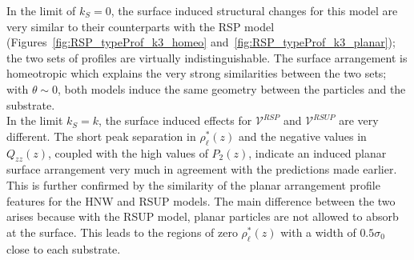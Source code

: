 In the limit of $k_S=0$, the surface induced structural changes for this model are very
similar to their counterparts with the RSP model (Figures~\ref{fig:RSP_typeProf_k3_homeo} 
and~\ref{fig:RSP_typeProf_k3_planar}); the two sets of profiles
are virtually indistinguishable. The surface arrangement is homeotropic which explains the
very strong similarities between the two sets; with $\theta\sim0$, 
both models induce the same geometry between the particles and the substrate.\\
%
In the limit $k_S=k$, the surface induced effects for $\mathcal{V}^{RSP}$ and $\mathcal{V}^{RSUP}$
are very different.
The short peak separation in $\rho^{*}_\ell(z)$ and the negative values in $Q_{zz}(z)$, coupled with 
the high values of $P_2(z)$, indicate an induced planar surface arrangement very much in
agreement with the predictions made earlier. This is further confirmed by the
similarity of the planar arrangement profile features for the HNW and RSUP models. The main difference
between the two arises because with the RSUP model, planar particles are not allowed to 
absorb at the surface. 
This leads to the regions of zero $\rho^{*}_\ell(z)$ with a width of $0.5\sigma_0$ close to 
each substrate.\\

